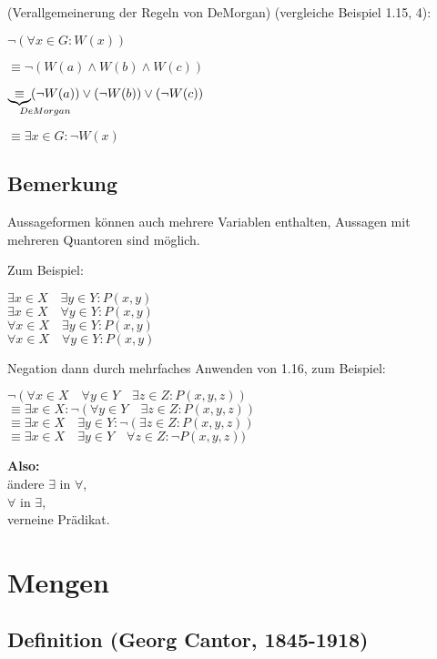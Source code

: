 \documentclass[a4paper, 12pt, twoside] {article}
\begin{document}
(Verallgemeinerung der Regeln von DeMorgan)
(vergleiche Beispiel 1.15, 4):

$\neg (\forall x \in G: W(x))$

$\equiv \neg (W(a) \wedge W(b) \wedge W(c))$

$\underbrace{\equiv}_{\mathrlap{DeMorgan}} (\neg W(a)) \lor (\neg W(b)) \lor (\neg W(c))$

$\equiv \exists x \in G: \neg W(x)$


\subsection*{Bemerkung}
Aussageformen können auch mehrere Variablen enthalten, Aussagen mit mehreren Quantoren sind möglich.

Zum Beispiel:

$\exists x \in X \quad \exists y \in Y: P(x,y)$ \\
$\exists x \in X \quad \forall y \in Y: P(x,y)$ \\
$\forall x \in X \quad \exists y \in Y: P(x,y)$ \\
$\forall x \in X \quad \forall y \in Y: P(x,y)$

Negation dann durch mehrfaches Anwenden von 1.16, zum Beispiel:

$\neg (\forall x \in X \quad \forall y \in Y \quad \exists z \in Z : P(x,y,z))$ \\
$\equiv \exists x \in X : \neg (\forall y \in Y \quad \exists z \in Z : P(x,y,z))$ \\
$\equiv \exists x \in X \quad \exists y \in Y : \neg (\exists z \in Z : P(x,y,z))$ \\
$\equiv \exists x \in X \quad \exists y \in Y \quad \forall z \in Z : \neg P(x,y,z))$

\textbf{Also: }\\
ändere $\exists$ in $\forall$, \\
\text{\qquad \quad} $\forall$ in $\exists$, \\
verneine Prädikat.

\section{Mengen}

\subsection{Definition (Georg Cantor, 1845-1918)}
\end{document}
